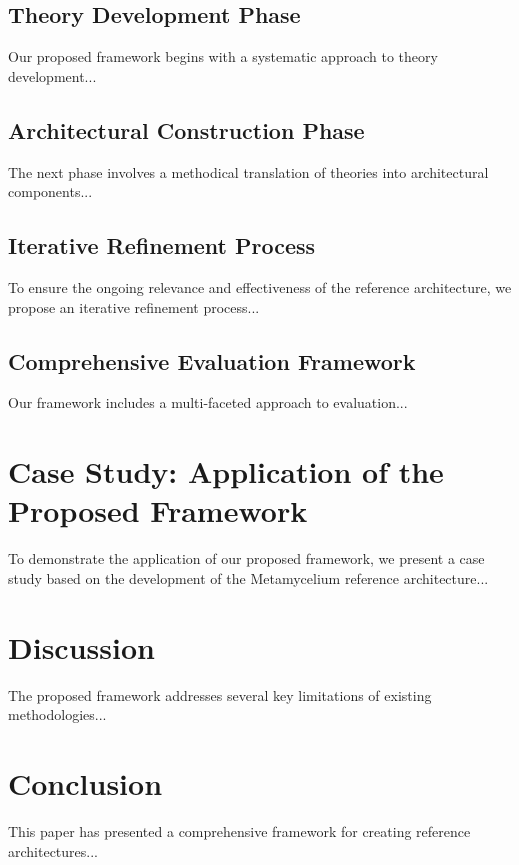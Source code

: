 \documentclass[12pt,a4paper]{article}
\begin{document}
\subsection{Theory Development Phase}
\label{subsec:theory-dev}
Our proposed framework begins with a systematic approach to theory development...

\subsection{Architectural Construction Phase}
\label{subsec:arch-construction}
The next phase involves a methodical translation of theories into architectural components...

\subsection{Iterative Refinement Process}
\label{subsec:refinement}
To ensure the ongoing relevance and effectiveness of the reference architecture, we propose an iterative refinement process...

\subsection{Comprehensive Evaluation Framework}
\label{subsec:eval-framework}
Our framework includes a multi-faceted approach to evaluation...

\section{Case Study: Application of the Proposed Framework}
\label{sec:case-study}
To demonstrate the application of our proposed framework, we present a case study based on the development of the Metamycelium reference architecture...

\section{Discussion}
\label{sec:discussion}
The proposed framework addresses several key limitations of existing methodologies...

\section{Conclusion}
\label{sec:conclusion}
This paper has presented a comprehensive framework for creating reference architectures...



\end{document}
